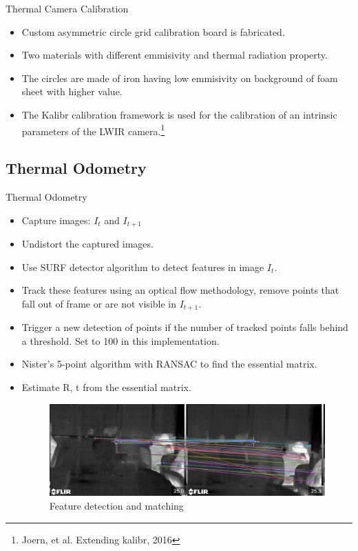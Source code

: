 \documentclass[10pt]{beamer}
\begin{document}
\begin{frame}{Thermal Camera Calibration}
\begin{minipage}{0.47\textwidth}
    \end{minipage}
    \begin{itemize}
        \item Custom asymmetric circle grid calibration board is fabricated.
        \pause
        \item Two materials with different emmisivity and thermal radiation property.
        \item The circles are made of iron having low emmisivity  on background of foam sheet with higher value.
        \pause
        \item The Kalibr calibration framework is used for the calibration of an intrinsic parameters of the LWIR camera.\footnote{Joern, et al. Extending kalibr, 2016}
    \end{itemize}
\end{frame}

\subsection*{Thermal Odometry}
\begin{frame}{Thermal Odometry}
    \begin{itemize}
        \item Capture images: $I_t$ and $I_{t + 1}$
        \item Undistort the captured images.
        \item Use SURF detector algorithm to detect features in image $I_t$. 
        \item Track these features using an optical flow methodology, remove points that fall out of frame or are not visible in $I_{t + 1}$. 
        \item Trigger a new detection of points if the number of tracked points falls behind a threshold. Set to 100 in this implementation.
        \item Nister's 5-point algorithm with RANSAC to find the essential matrix.
        \item Estimate R, t from the essential matrix.
        \begin{figure}[h!]
            \centering
            \includegraphics[scale=0.20]{Thermal_feature_matching.png}
            \caption{Feature detection and matching}
            \label{fig: tio}
        \end{figure}
    \end{itemize}
\end{frame}
\end{document}
